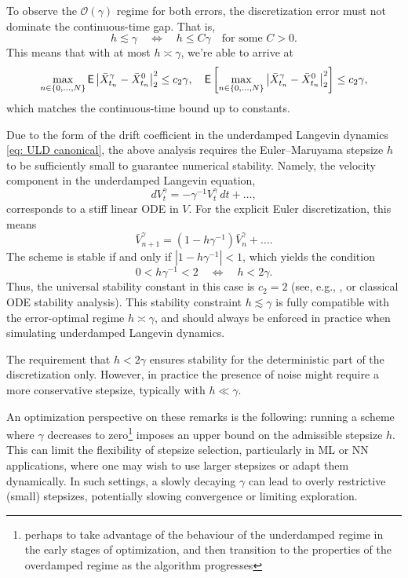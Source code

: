 \documentclass[12pt]{article}
\begin{document}
To observe the $\mathcal{O}(\gamma)$ regime for both errors, the discretization error must not dominate the continuous-time gap. That is,
\[
h \lesssim \gamma\quad\Longleftrightarrow\quad h \leq C \gamma \quad \text{for some } C > 0.
\]
This means that with at most $h \asymp \gamma$, we're able to arrive at
\[
\max_{n\in\{0,\ldots,N\}} {\mathsf E}\left|\bar{X}_{t_n}^\gamma - \bar{X}_{t_n}^0\right|_2^2 \le c_2\gamma,\quad {\mathsf E}\left[\max_{n\in\{0,\ldots,N\}}\left|\bar{X}_{t_n}^\gamma - \bar{X}_{t_n}^0\right|_2^2\right] \le c_2\gamma,
\]
which matches the continuous-time bound up to constants.

\begin{remark}
Due to the form of the drift coefficient in the underdamped Langevin dynamics \eqref{eq: ULD canonical}, the above analysis requires the Euler--Maruyama stepsize $h$ to be sufficiently small to guarantee numerical stability.
Namely, the velocity component in the underdamped Langevin equation,
\[
dV_t^\gamma = -\gamma^{-1} V_t^\gamma\,dt + \ldots,
\]
corresponds to a stiff linear ODE in $V$. For the explicit Euler discretization, this means
\[
\bar{V}^\gamma_{n+1} = (1 - h\gamma^{-1}) \bar{V}^\gamma_n + \ldots.
\]
The scheme is stable if and only if $|1 - h\gamma^{-1}| < 1$, which yields the condition
\[
0 < h\gamma^{-1} < 2\quad\Longleftrightarrow\quad h < 2\gamma.
\]
Thus, the universal stability constant in this case is $c_2 = 2$ (see, e.g., \cite{msh02}, or classical ODE stability analysis).
This stability constraint $h \lesssim \gamma$ is fully compatible with the error-optimal regime $h \asymp \gamma$, and should always be enforced in practice when simulating underdamped Langevin dynamics.
\end{remark}

\begin{remark}
\label{remark: h ll gamma}
The requirement that $h < 2\gamma$ ensures stability for the deterministic part of the discretization only. However, in practice the presence of noise might require a more conservative stepsize, typically with $h \ll \gamma$.
\end{remark}

An optimization perspective on these remarks is the following: running a scheme where $\gamma$ decreases to zero\footnote{perhaps to take advantage of the behaviour of the underdamped regime in the early stages of optimization, and then transition to the properties of the overdamped regime as the algorithm progresses} imposes an upper bound on the admissible stepsize $h$. This can limit the flexibility of stepsize selection, particularly in ML or NN applications, where one may wish to use larger stepsizes or adapt them dynamically. In such settings, a slowly decaying $\gamma$ can lead to overly restrictive (small) stepsizes, potentially slowing convergence or limiting exploration.\\
\end{document}
